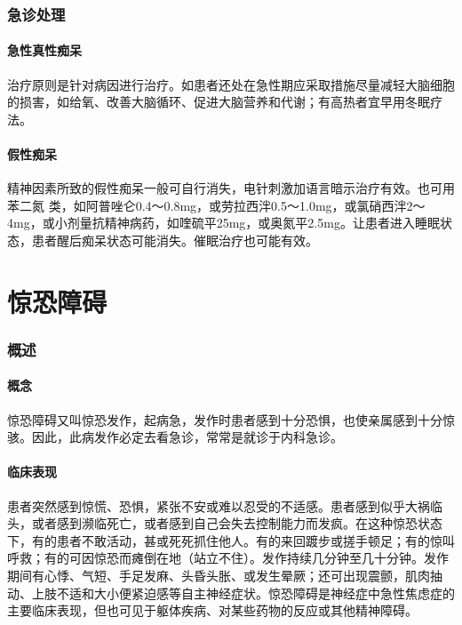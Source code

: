 \subsubsection{急诊处理}

\paragraph{急性真性痴呆}

治疗原则是针对病因进行治疗。如患者还处在急性期应采取措施尽量减轻大脑细胞的损害，如给氧、改善大脑循环、促进大脑营养和代谢；有高热者宜早用冬眠疗法。

\paragraph{假性痴呆}

精神因素所致的假性痴呆一般可自行消失，电针刺激加语言暗示治疗有效。也可用苯二氮{}
类，如阿普唑仑0.4～0.8mg，或劳拉西泮0.5～1.0mg，或氯硝西泮2～4mg，或小剂量抗精神病药，如喹硫平25mg，或奥氮平2.5mg。让患者进入睡眠状态，患者醒后痴呆状态可能消失。催眠治疗也可能有效。

\protect\hypertarget{text00051.html}{}{}

\section{惊恐障碍}

\subsubsection{概述}

\paragraph{概念}

惊恐障碍又叫惊恐发作，起病急，发作时患者感到十分恐惧，也使亲属感到十分惊骇。因此，此病发作必定去看急诊，常常是就诊于内科急诊。

\paragraph{临床表现}

患者突然感到惊慌、恐惧，紧张不安或难以忍受的不适感。患者感到似乎大祸临头，或者感到濒临死亡，或者感到自己会失去控制能力而发疯。在这种惊恐状态下，有的患者不敢活动，甚或死死抓住他人。有的来回踱步或搓手顿足；有的惊叫呼救；有的可因惊恐而瘫倒在地（站立不住）。发作持续几分钟至几十分钟。发作期间有心悸、气短、手足发麻、头昏头胀、或发生晕厥；还可出现震颤，肌肉抽动、上肢不适和大小便紧迫感等自主神经症状。惊恐障碍是神经症中急性焦虑症的主要临床表现，但也可见于躯体疾病、对某些药物的反应或其他精神障碍。

